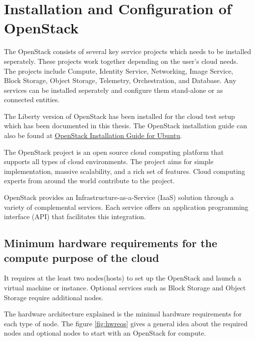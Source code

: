 
\chapter{Installation and Configuration of OpenStack}\label{ch:installationofopenstack}

The OpenStack consists of several key service projects which needs to be installed seperately.
These projects work together depending on the user's cloud needs.
The projects include Compute, Identity Service, Networking, Image Service, Block Storage, Object Storage, Telemetry, Orchestration, and Database.
Any services can be installed seperately and configure them stand-alone or as connected entities.

The Liberty version of OpenStack has been installed for the cloud test setup which has been documented in this thesis.
The OpenStack installation guide can also be found at \href{http://docs.openstack.org/liberty/install-guide-ubuntu/} {OpenStack Installation Guide for Ubuntu}.

The OpenStack project is an open source cloud computing platform that supports all types of cloud environments.
The project aims for simple implementation, massive scalability, and a rich set of features.
Cloud computing experts from around the world contribute to the project.

OpenStack provides an Infrastructure-as-a-Service (IaaS) solution through a variety of complemental services.
Each service offers an application programming interface (API) that facilitates this integration.



\section{Minimum hardware requirements for the compute purpose of the cloud}\label{sec:hardwarerequirements}
It requires at the least two nodes(hosts) to set up the OpenStack and launch a virtual machine or instance.
Optional services such as Block Storage and Object Storage require additional nodes.

The hardware architecture explained is the minimal hardware requirements for each type of node.
The figure \ref{fig:hwreqs} gives a general idea about the required nodes and optional nodes to start with an OpenStack for compute.

